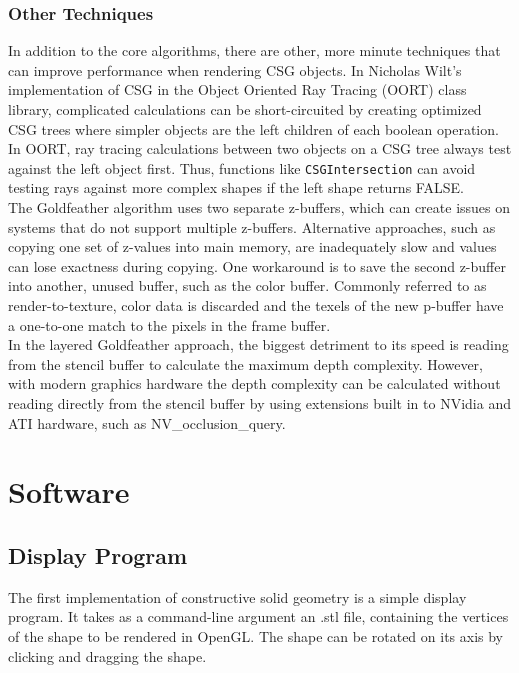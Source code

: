 \documentclass[12pt]{article}
\begin{document}
\begin{doublespace}
\subsubsection{Other Techniques}
In addition to the core algorithms, there are other, more minute techniques that can improve performance when rendering CSG objects. In Nicholas Wilt's implementation of CSG in the Object Oriented Ray Tracing (OORT) class library, complicated calculations can be short-circuited by creating optimized CSG trees where simpler objects are the left children of each boolean operation. In OORT, ray tracing calculations between two objects on a CSG tree always test against the left object first. Thus, functions like \texttt{CSGIntersection} can avoid testing rays against more complex shapes if the left shape returns FALSE\cite{raytrace}.\\

The Goldfeather algorithm uses two separate z-buffers, which can create issues on systems that do not support multiple z-buffers. Alternative approaches, such as copying one set of z-values into main memory, are inadequately slow and values can lose exactness during copying. One workaround is to save the second z-buffer into another, unused buffer, such as the color buffer. Commonly referred to as render-to-texture, color data is discarded and the texels of the new p-buffer have a one-to-one match to the pixels in the frame buffer\cite{hardware_csg}.\\

In the layered Goldfeather approach, the biggest detriment to its speed is reading from the stencil buffer to calculate the maximum depth complexity. However, with modern graphics hardware the depth complexity can be calculated without reading directly from the stencil buffer by using extensions built in to NVidia and ATI hardware, such as NV\_occlusion\_query\cite{hardware_csg}. 

\section{Software}
\subsection{Display Program}
The first implementation of constructive solid geometry is a simple display program. It takes as a command-line argument an .stl file, containing the vertices of the shape to be rendered in OpenGL. The shape can be rotated on its axis by clicking and dragging the shape.

\end{doublespace}
\end{document}
